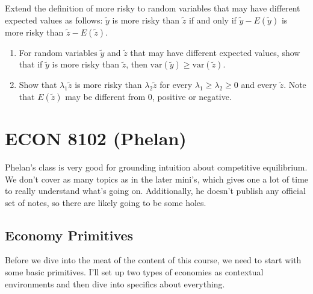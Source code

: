 \documentclass[11pt,english]{article}
\begin{document}
Extend the definition of more risky to random variables that may have
different expected values as follows: $\tilde{y}$ is more risky than $\tilde{z}$
if and only if $\tilde{y} - E(\tilde{y})$ is more risky than $\tilde{z} -
E(\tilde{z})$.
 
\begin{enumerate}
    \item[(3)] For random variables $\tilde{y}$ and $\tilde{z}$ that may have
        different expected values, show that if $\tilde{y}$ is more risky than
        $\tilde{z}$, then $\mathrm{var}(\tilde{y}) \geq \mathrm{var}(\tilde{z})$.
    \begin{solution}
 
    \end{solution}
 
    \item[(4)] Show that $\lambda_1 \tilde{z}$ is more risky than $\lambda_2
        \tilde{z}$ for every $\lambda_1 \geq \lambda_2 \geq 0$ and every
        $\tilde{z}$. Note that $E(\tilde{z})$ may be different from 0,
        positive or negative.
    \begin{solution}
 
    \end{solution}
\end{enumerate}

\section{ECON 8102 (Phelan)}
Phelan's class is very good for grounding intuition about competitive equilibrium. We don't cover as many topics as in the later mini's, which gives one a lot of time to really understand what's going on. Additionally, he doesn't publish any official set of notes, so there are likely going to be some holes.

\subsection{Economy Primitives}

Before we dive into the meat of the content of this course, we need to start with some basic primitives. I'll set up two types of economies as contextual environments and then dive into specifics about everything.\\
\end{document}
